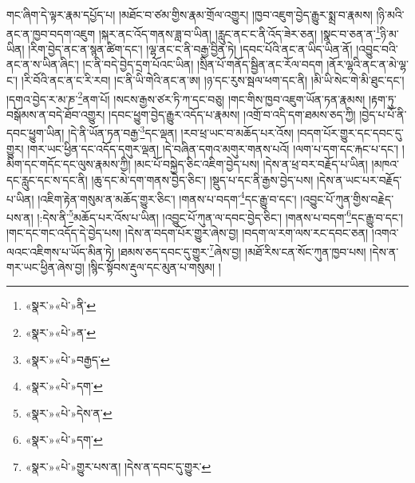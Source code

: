 གང་ཞིག་དེ་ལྟར་རྣམ་དཔྱོད་པ། །མཐོང་བ་ཙམ་གྱིས་རྣམ་གྲོལ་འགྱུར། །ཁྱབ་འཇུག་བྱེད་རྒྱུར་སྨྲ་བ་རྣམས། །ཉི་མའི་ནང་ན་ཁྱབ་བདག་འཇུག །སྐར་ནང་འོད་གནས་ཟླ་བ་ཡིན། །རླུང་ནང་ང་ནི་འོད་ཟེར་ཅན། །སྣང་བ་ཅན་ན་\footnote{«སྣར་»«པེ་»ནི་}ཉི་མ་ཡིན། །རིག་བྱེད་ནང་ན་སྙན་ཚིག་དང་། །ལྷ་ནང་ང་ནི་བརྒྱ་བྱིན་ཏེ། །དབང་པོའི་ནང་ན་ཡིད་ཡིན་ནོ། །འབྱུང་བའི་ནང་ན་ས་ཡིན་ཞིང་། །ང་ནི་བདེ་བྱེད་དྲག་པོའང་ཡིན། །སྲིན་པོ་གནོད་སྦྱིན་ནང་རོལ་བདག །ནོར་ལྷའི་ནང་ན་མེ་ལྷ་ང་། །རི་བོའི་ནང་ན་ང་རི་རབ། །ང་ནི་ཡི་གེའི་ནང་ན་ཨ། །ཉ་དང་རུས་སྦལ་ཕག་དང་ནི། །མི་ཡི་སེང་གེ་མི་ཐུང་དང་། །དགའ་བྱེད་ར་མ་ཎ་\footnote{«སྣར་»«པེ་»ན་}ནག་པོ། །སངས་རྒྱས་ཙར་ཏི་ཀ་དང་བཅུ། །གང་གིས་ཁྱབ་འཇུག་ཡོན་ཏན་རྣམས། །རྟག་ཏུ་བསྒོམས་ན་བདེ་ཐོབ་འགྱུར། །དབང་ཕྱུག་བྱེད་རྒྱུར་འདོད་པ་རྣམས། །འགྲོ་བ་འདི་དག་ཐམས་ཅད་ཀྱི། །བྱེད་པ་པོ་ནི་དབང་ཕྱུག་ཡིན། །དེ་ནི་ཡོན་ཏན་བརྒྱ་\footnote{«སྣར་»«པེ་»བརྒྱད་}དང་ལྡན། །རབ་ཕྲ་ཡང་བ་མཆོད་པར་འོས། །བདག་པོར་གྱུར་དང་དབང་དུ་གྱུར། །གར་ཡང་ཕྱིན་དང་འདོད་དགུར་ལྡན། །དེ་བཞིན་དགའ་མགུར་གནས་པའོ། །ལག་པ་དག་དང་རྐང་པ་དང་། །མིག་དང་གདོང་དང་ལུས་རྣམས་ཀྱི། །མང་པོ་བསྐྱེད་ཅིང་འཇིག་བྱེད་པས། །དེས་ན་ཕྲ་བར་བརྗོད་པ་ཡིན། །མཁའ་དང་རླུང་དང་ས་དང་ནི། །ཆུ་དང་མེ་དག་གནས་བྱེད་ཅིང་། །སྡུད་པ་དང་ནི་རྒྱས་བྱེད་པས། །དེས་ན་ཡང་པར་བརྗོད་པ་ཡིན། །འཇིག་རྟེན་གསུམ་ན་མཆོད་གྱུར་ཅིང་། །གནས་པ་བདག་\footnote{«སྣར་»«པེ་»དག་}དང་རྒྱུ་བ་དང་། །འབྱུང་པོ་ཀུན་གྱིས་བརྗེད་པས་ན། །:དེས་ནི་\footnote{«སྣར་»«པེ་»དེས་ན་}མཆོད་པར་འོས་པ་ཡིན། །འབྱུང་པོ་ཀུན་ལ་དབང་བྱེད་ཅིང་། །གནས་པ་བདག་\footnote{«སྣར་»«པེ་»དག་}དང་རྒྱུ་བ་དང་། །གང་དང་གང་འདོད་དེ་བྱེད་པས། །དེས་ན་བདག་པོར་གྱུར་ཞེས་བྱ། །བདག་ལ་རག་ལས་རང་དབང་ཅན། །འགའ་ལའང་འཇིགས་པ་ཡོད་མིན་ཏེ། །ཐམས་ཅད་དབང་དུ་གྱུར་\footnote{«སྣར་»«པེ་»གྱུར་པས་ན། །དེས་ན་དབང་དུ་གྱུར་}ཞེས་བྱ། །མཐོ་རིས་ངན་སོང་ཀུན་ཁྱབ་པས། །དེས་ན་གར་ཡང་ཕྱིན་ཞེས་བྱ། །སྙིང་སྟོབས་རྡུལ་དང་མུན་པ་གསུམ། །
